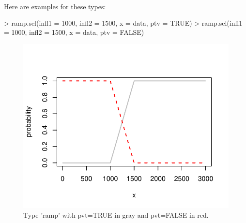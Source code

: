 \documentclass[letterpaper, 12pt]{article}
\begin{document}
Here are examples for these types:

\begin{Schunk}
\begin{Sinput}
> ramp.sel(infl1 = 1000, infl2 = 1500, x = data, ptv = TRUE)
> ramp.sel(infl1 = 1000, infl2 = 1500, x = data, ptv = FALSE)
\end{Sinput}
\end{Schunk}
\begin{figure}[h]
\begin{center}
\includegraphics{relation_sel-006}
\end{center}
\caption{Type 'ramp' with pvt=TRUE in gray and pvt=FALSE in red.}
\label{fig3}
\end{figure}
\end{document}
